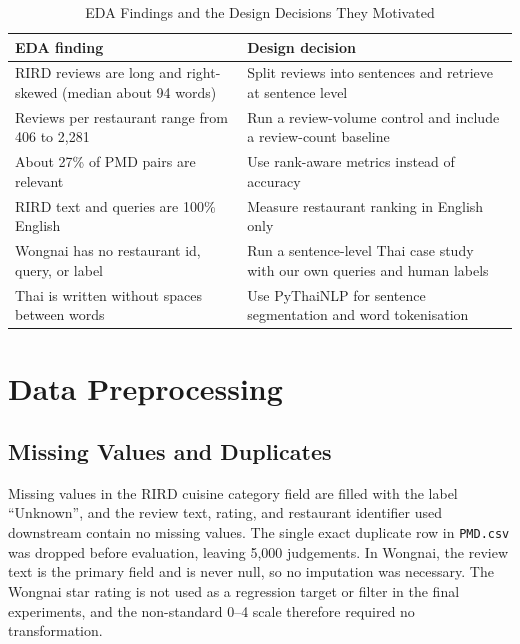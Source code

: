 \begin{table}[htbp]
\centering
\caption{EDA Findings and the Design Decisions They Motivated}
\label{tab:edadecisions}
\small
\begin{tabular}{|p{}|p{}|}
\hline
\textbf{EDA finding} & \textbf{Design decision} \\
\hline
RIRD reviews are long and right-skewed (median about 94 words) & Split reviews into sentences and retrieve at sentence level \\
\hline
Reviews per restaurant range from 406 to 2,281 & Run a review-volume control and include a review-count baseline \\
\hline
About 27\% of PMD pairs are relevant & Use rank-aware metrics instead of accuracy \\
\hline
RIRD text and queries are 100\% English & Measure restaurant ranking in English only \\
\hline
Wongnai has no restaurant id, query, or label & Run a sentence-level Thai case study with our own queries and human labels \\
\hline
Thai is written without spaces between words & Use PyThaiNLP for sentence segmentation and word tokenisation \\
\hline
\end{tabular}
\end{table}

\section{Data Preprocessing}
\label{sec:preprocessing}

\subsection{Missing Values and Duplicates}
\label{sec:missing}

Missing values in the RIRD cuisine category field are filled with the label ``Unknown'', and the review text, rating, and restaurant identifier used downstream contain no missing values. The single exact duplicate row in \texttt{PMD.csv} was dropped before evaluation, leaving 5,000 judgements. In Wongnai, the review text is the primary field and is never null, so no imputation was necessary. The Wongnai star rating is not used as a regression target or filter in the final experiments, and the non-standard 0--4 scale therefore required no transformation.

